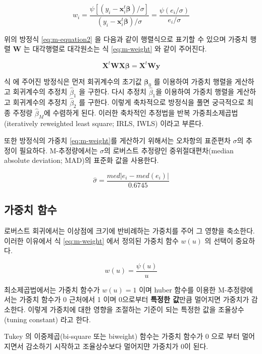 \documentclass[
  10pt,
]{book}
\theoremstyle{definition}
\theoremstyle{definition}
\theoremstyle{definition}
\theoremstyle{definition}
\theoremstyle{remark}
\begin{document}
\begin{equation}
 w_i =  \frac{  \psi [  (y_i - {\bm x}_i^t \bm \beta)/\sigma ]  }{(y_i - {\bm x}_i^t \bm \beta)/\sigma} 
 = \frac{ \psi(e_i/\sigma)}{e_i/\sigma}
\label{eq:m-weight}
\end{equation}

위의 방정식 \eqref{eq:m-equation2} 을 다음과 같이 행렬식으로 표기할 수 있으며 가중치 행렬 \(\bm W\) 는
대각행렬로 대각원소는 식 \eqref{eq:m-weight} 와 같이 주어진다.

\begin{equation}
\bm X^t \bm W \bm X \bm \beta = \bm X^t \bm W \bm y
\label{eq:m-equation3}
\end{equation}

식 \label{eq:m-equation3} 에 주어진 방정식은 먼저 회귀계수의 초기값 \({\bm \beta}_0\) 를 이용하여 가중치 행렬을 게산하고
회귀계수의 추정치 \({\hat \beta}_1\) 을 구한다. 다시 추정치 \({\hat \beta}_1\)을 이용하여 가중치 행렬을 게산하고
회귀계수의 추정치 \({\hat \beta}_2\) 를 구한다. 이렇게 축차적으로 방정식을 풀면 궁극적으로 최종 주정량 \({\hat \beta}_M\)에 수렴하게 된다. 이러한 축차적인 추정법을 반복 가중최소제곱법(iteratively reweighted least square; IRLS, IWLS) 이라고 부른다.

또한 방정식의 가중치 \eqref{eq:m-weight}를 게산하기 위해서는 오차항의 표준편차 \(\sigma\)의 추정이 필요하다. M-추정량에서는
\(\sigma\)의 로버스트 추정량인 중위절대편차(median absolute deviation; MAD)의 표준화 값을 사용한다.

\[ \hat \sigma = \frac{ med | e_i -med(e_i)| } { 0.6745} \]

\hypertarget{uxac00uxc911uxce58-uxd568uxc218}{%
\subsection{가중치 함수}\label{uxac00uxc911uxce58-uxd568uxc218}}

로버스트 회귀에서는 이상점에 크기에 반비례하는 가중치를 주어 그 영향을 축소한다. 이러한 이유에서
식 \eqref{eq:m-weight} 에서 정의된 가중치 함수 \(w(u)\) 의 선택이 중요하다.

\[ w(u) = \frac{\psi(u)}{u} \]

최소제곱법에서는 가중치 함수가 \(w(u)=1\) 이며 huber 함수를 이용한 M-추정량에서는 가중치 함수가 0 근처에서 1 이며 0으로부터 \textbf{특정한 값}만큼 멀어지면 가중치가 감소한다. 이렇게 가중치에 대한 영향을 조절하는 기준이 되는 특정한 값을 조율상수(tuning constant) 라고 한다.

Tukey 의 이중제곱(bi-square 또는 biweight) 함수는 가중치 함수가 0 으로 부터 멀어지면서 감소하기 시작하고 조율상수보다 멀어지먄 가중치가 0이 된다.
\end{document}
